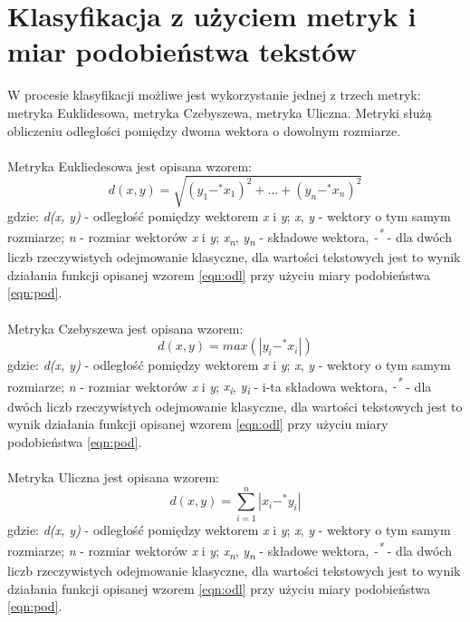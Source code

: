 \documentclass{classrep}
\begin{document}
\section{Klasyfikacja z użyciem metryk i miar podobieństwa tekstów}

W procesie klasyfikacji możliwe jest wykorzystanie jednej z trzech metryk: metryka Euklidesowa, metryka Czebyszewa, metryka Uliczna. Metryki służą obliczeniu odległości pomiędzy dwoma wektora o dowolnym rozmiarze.\\\\ Metryka Eukliedesowa\cite{dane} jest opisana wzorem: 
\begin{equation} d(x, y) = \sqrt{(y_1 -^* x_1)^2 + ... + (y_n -^* x_n)^2}  \end{equation}
gdzie: \textit{d(x, y)} - odległość pomiędzy wektorem \textit{x} i \textit{y}; \textit{x}, \textit{y} - wektory o tym samym rozmiarze; \textit{n} - rozmiar wektorów \textit{x} i \textit{y};  \textit{x\textsubscript{n}}, \textit{y\textsubscript{n}} - składowe wektora, \textit{-\textsuperscript{*}} - dla dwóch liczb rzeczywistych odejmowanie klasyczne,  dla wartości tekstowych jest to wynik działania funkcji opisanej wzorem \ref{eqn:odl} przy użyciu miary podobieństwa \ref{eqn:pod}.
\\\\
Metryka Czebyszewa\cite{dane} jest opisana wzorem: 
\begin{equation} d(x, y) = max(|y_i -^* x_i|) \end{equation}
gdzie:  \textit{d(x, y)} - odległość pomiędzy wektorem  \textit{x} i \textit{y}; \textit{x}, \textit{y} - wektory o tym samym rozmiarze; \textit{n} - rozmiar wektorów \textit{x} i \textit{y};   \textit{x\textsubscript{i}},  \textit{y\textsubscript{i}} - i-ta składowa wektora, \textit{-\textsuperscript{*}} - dla dwóch liczb rzeczywistych odejmowanie klasyczne,  dla wartości tekstowych jest to wynik działania funkcji opisanej wzorem \ref{eqn:odl} przy użyciu miary podobieństwa \ref{eqn:pod}.
\\\\
Metryka Uliczna\cite{dane} jest opisana wzorem: 
\begin{equation} d(x, y) = \sum_{i = 1}^{n} |x_i -^* y_i| \end{equation}
gdzie: \textit{d(x, y)} - odległość pomiędzy wektorem \textit{x} i \textit{y}; \textit{x}, \textit{y} - wektory o tym samym rozmiarze; \textit{n} - rozmiar wektorów \textit{x} i \textit{y};  \textit{x\textsubscript{n}}, \textit{y\textsubscript{n}} - składowe wektora, \textit{-\textsuperscript{*}} - dla dwóch liczb rzeczywistych odejmowanie klasyczne,  dla wartości tekstowych jest to wynik działania funkcji opisanej wzorem \ref{eqn:odl} przy użyciu miary podobieństwa \ref{eqn:pod}.
\end{document}
